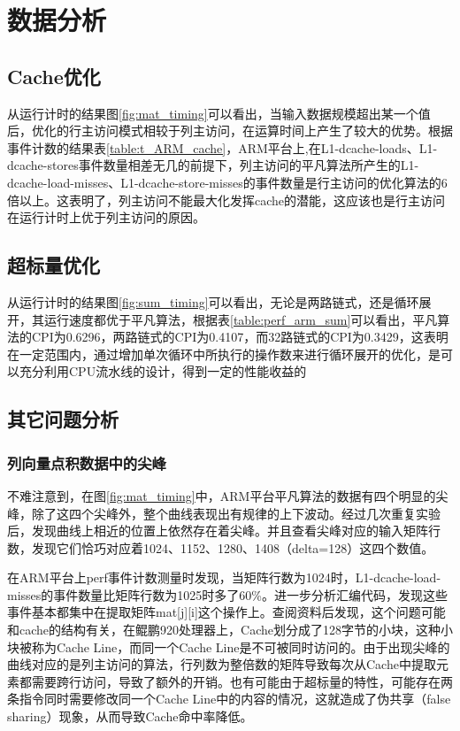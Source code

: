\documentclass[a4paper]{article}
\begin{document}
\section{数据分析}

\subsection{Cache优化}
从运行计时的结果图\ref{fig:mat_timing}可以看出，当输入数据规模超出某一个值后，优化的行主访问模式相较于列主访问，在运算时间上产生了较大的优势。根据事件计数的结果表\ref{table:t_ARM_cache}，ARM平台上,在L1-dcache-loads、L1-dcache-stores事件数量相差无几的前提下，列主访问的平凡算法所产生的L1-dcache-load-misses、L1-dcache-store-misses的事件数量是行主访问的优化算法的6倍以上。这表明了，列主访问不能最大化发挥cache的潜能，这应该也是行主访问在运行计时上优于列主访问的原因。

\subsection{超标量优化}
从运行计时的结果图\ref{fig:sum_timing}可以看出，无论是两路链式，还是循环展开，其运行速度都优于平凡算法，根据表\ref{table:perf_arm_sum}可以看出，平凡算法的CPI为0.6296，两路链式的CPI为0.4107，而32路链式的CPI为0.3429，这表明在一定范围内，通过增加单次循环中所执行的操作数来进行循环展开的优化，是可以充分利用CPU流水线的设计，得到一定的性能收益的

\subsection{其它问题分析}
\subsubsection{列向量点积数据中的尖峰}
不难注意到，在图\ref{fig:mat_timing}中，ARM平台平凡算法的数据有四个明显的尖峰，除了这四个尖峰外，整个曲线表现出有规律的上下波动。经过几次重复实验后，发现曲线上相近的位置上依然存在着尖峰。并且查看尖峰对应的输入矩阵行数，发现它们恰巧对应着1024、1152、1280、1408（delta=128）这四个数值。

在ARM平台上perf事件计数测量时发现，当矩阵行数为1024时，L1-dcache-load-misses的事件数量比矩阵行数为1025时多了60\%。进一步分析汇编代码，发现这些事件基本都集中在提取矩阵mat[j][i]这个操作上。查阅资料后发现，这个问题可能和cache的结构有关，在鲲鹏920处理器上，Cache划分成了128字节的小块，这种小块被称为Cache Line，而同一个Cache Line是不可被同时访问的。由于出现尖峰的曲线对应的是列主访问的算法，行列数为整倍数的矩阵导致每次从Cache中提取元素都需要跨行访问，导致了额外的开销。也有可能由于超标量的特性，可能存在两条指令同时需要修改同一个Cache Line中的内容的情况，这就造成了伪共享（false sharing）现象，从而导致Cache命中率降低。
\end{document}
